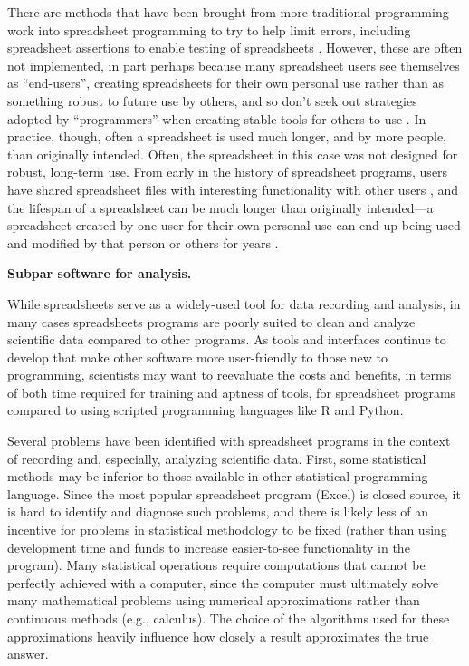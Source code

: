 \documentclass[]{tufte-book}
\begin{document}
There are methods that have been brought from more traditional programming work
into spreadsheet programming to try to help limit errors, including spreadsheet
assertions to enable testing of spreadsheets \citep{hermans2016spreadsheets}.
However, these are often not implemented, in part perhaps because many
spreadsheet users see themselves as ``end-users'', creating spreadsheets for their
own personal use rather than as something robust to future use by others, and so
don't seek out strategies adopted by ``programmers'' when creating stable tools
for others to use \citep{hermans2016spreadsheets}. In practice, though, often a
spreadsheet is used much longer, and by more people, than originally intended.
Often, the spreadsheet in this case was not designed for robust, long-term use.
From early in the history of spreadsheet programs, users have shared spreadsheet
files with interesting functionality with other users \citep{levy1984spreadsheet},
and the lifespan of a spreadsheet can be much longer than originally
intended---a spreadsheet created by one user for their own personal use can end
up being used and modified by that person or others for years
\citep{hermans2016spreadsheets}.

\textbf{Subpar software for analysis.}

While spreadsheets serve as a widely-used tool for data recording and analysis,
in many cases spreadsheets programs are poorly suited to clean and analyze
scientific data compared to other programs. As tools and interfaces continue to
develop that make other software more user-friendly to those new to programming,
scientists may want to reevaluate the costs and benefits, in terms of both time
required for training and aptness of tools, for spreadsheet programs compared to
using scripted programming languages like R and Python.

Several problems have been identified with spreadsheet programs in the context of
recording and, especially, analyzing scientific data. First, some statistical
methods may be inferior to those available in other statistical programming language.
Since the most popular spreadsheet program (Excel) is closed source, it is hard to
identify and diagnose such problems, and there is likely less of an incentive for
problems in statistical methodology to be fixed (rather than using development time
and funds to increase easier-to-see functionality in the program). Many statistical
operations require computations that cannot be perfectly achieved with a
computer, since the computer must ultimately solve many mathematical problems using
numerical approximations rather than continuous methods (e.g., calculus). The choice of
the algorithms used for these approximations heavily influence how closely a result
approximates the true answer.
\end{document}
